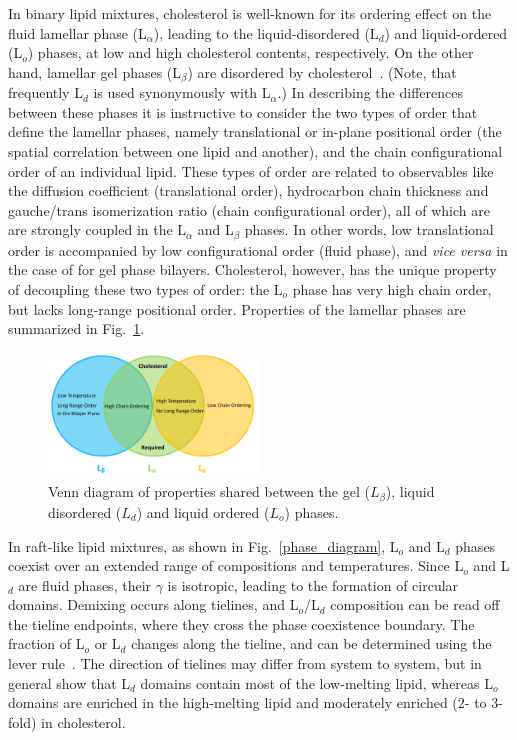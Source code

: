 \documentclass[8.5pt,twoside,twocolumn]{article}
\begin{document}
In binary lipid mixtures, cholesterol is well-known for its ordering effect on the fluid lamellar phase (L$_\alpha$), leading to the liquid-disordered (L$_d$) and liquid-ordered (L$_o$) phases, at low and high cholesterol contents, respectively.  On the other hand, lamellar gel phases (L$_\beta$) are disordered by cholesterol~\cite{Mouritsen.1994}. (Note, that frequently L$_d$ is used synonymously with L$_\alpha$.) In describing the differences between these phases it is instructive to consider the two types of order that define the lamellar phases, namely translational or in-plane positional order (the spatial correlation between one lipid and another), and the chain configurational order of an individual lipid. These types of order are related to observables like the diffusion coefficient (translational order), hydrocarbon chain thickness and gauche/trans isomerization ratio (chain configurational order), all of which are are strongly coupled in the L$_\alpha$ and L$_\beta$ phases.  In other words, low translational order is accompanied by low configurational order (fluid phase), and \textit{vice versa} in the case of for gel phase bilayers. Cholesterol, however, has the unique property of decoupling these two types of order: the L$_o$ phase has very high chain order, but lacks long-range positional order. Properties of the lamellar phases are summarized in Fig.~\ref{phases}. 


\begin{figure}
\includegraphics[width=0.5\textwidth]{figures/phases.pdf}
\caption{Venn diagram of properties shared between the gel ($L_\beta$), liquid disordered ($L_d$) and liquid ordered ($L_o$) phases.}
\label{phases}
\end{figure}


In raft-like lipid mixtures, as shown in Fig.~\ref{phase_diagram}, L$_o$ and L$_d$ phases coexist over an extended range of compositions and temperatures. Since L$_o$ and L$_d$ are fluid phases, their $\gamma$ is isotropic, leading to the formation of circular domains. Demixing occurs along tielines, and L$_o$/L$_d$ composition can be read off the tieline endpoints, where they cross the phase coexistence boundary. The fraction of L$_o$ or L$_d$ changes along the tieline, and can be determined using the lever rule~\cite{Marsh.2009}. The direction of tielines may differ from system to system, but in general show that L$_d$ domains contain most of the low-melting lipid, whereas L$_o$ domains are enriched in the high-melting lipid and moderately enriched ($2$- to $3$-fold) in cholesterol.
\end{document}
